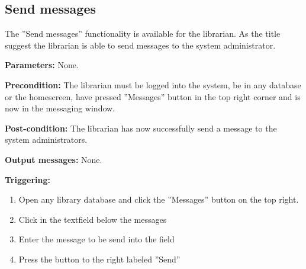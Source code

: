 \subsection{Send messages}

The ''Send messages'' functionality is available for the librarian.
As the title suggest the librarian is able to send messages to the
system administrator.

\begin{description}

\item \textbf{Parameters:} None.

\item \textbf{Precondition:} The librarian must be logged into the system, be in
any database or the homescreen, have pressed ''Messages'' button in the
top right corner and is now in the messaging window.

\item \textbf{Post-condition:} The librarian has now successfully send a message
to the system administrators.

\item \textbf{Output messages:} None.

\item \textbf{Triggering:}
\begin{enumerate}
\item Open any library database and click the ''Messages''
button on the top right.
\item Click in the textfield below the messages
\item Enter the message to be send into the field
\item Press the button to the right labeled ''Send''
\end{enumerate}

\end{description}	

